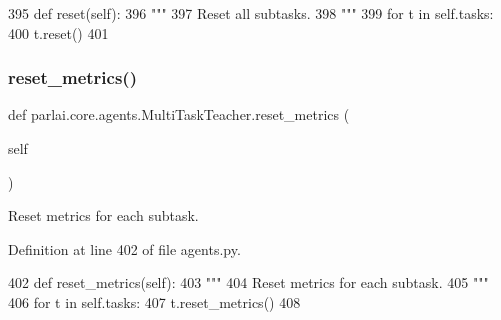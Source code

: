 \begin{DoxyCode}
395     \textcolor{keyword}{def }reset(self):
396         \textcolor{stringliteral}{"""}
397 \textcolor{stringliteral}{        Reset all subtasks.}
398 \textcolor{stringliteral}{        """}
399         \textcolor{keywordflow}{for} t \textcolor{keywordflow}{in} self.tasks:
400             t.reset()
401 
\end{DoxyCode}
\mbox{\label{classparlai_1_1core_1_1agents_1_1MultiTaskTeacher_a78eb3c163a158deda3bb6bd9000fcee2}} 
\subsubsection{\texorpdfstring{reset\+\_\+metrics()}{reset\_metrics()}}
{\footnotesize\ttfamily def parlai.\+core.\+agents.\+Multi\+Task\+Teacher.\+reset\+\_\+metrics (\begin{DoxyParamCaption}\item[{}]{self }\end{DoxyParamCaption})}

\begin{DoxyVerb}Reset metrics for each subtask.
\end{DoxyVerb}
 

Definition at line 402 of file agents.\+py.


\begin{DoxyCode}
402     \textcolor{keyword}{def }reset\_metrics(self):
403         \textcolor{stringliteral}{"""}
404 \textcolor{stringliteral}{        Reset metrics for each subtask.}
405 \textcolor{stringliteral}{        """}
406         \textcolor{keywordflow}{for} t \textcolor{keywordflow}{in} self.tasks:
407             t.reset\_metrics()
408 
\end{DoxyCode}
\mbox{\label{classparlai_1_1core_1_1agents_1_1MultiTaskTeacher_abb082dd4c5be92b7ce7683b16d0abd2c}} 
